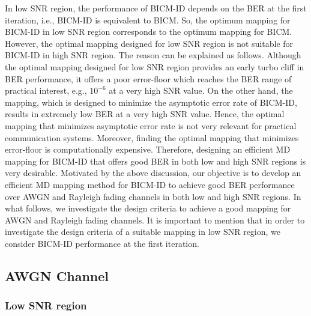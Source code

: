 \documentclass[12pt, draftclsnofoot, onecolumn]{IEEEtran}
\begin{document}
In low SNR region,   the performance of BICM-ID  depends on the    
BER  at the  first iteration, i.e.,  BICM-ID is equivalent to BICM.  So,  the optimum mapping for BICM-ID in low SNR region corresponds to  the optimum mapping for BICM. 
However, the optimal mapping designed for  low SNR region   is  not suitable for BICM-ID in  high SNR region. The reason can be explained as follows.  Although the optimal mapping designed for low SNR region provides an early turbo cliff in BER performance, it offers a poor error-floor which reaches the BER range of  practical interest, e.g., $10^{-6}$ at a very high SNR value.
 On the other hand,  the  mapping, which  is designed to minimize  the asymptotic error rate  of  BICM-ID, results in  extremely  low BER  at a very high SNR value.  Hence,  the  optimal mapping  that minimizes   asymptotic error rate   is not very relevant  for practical communication systems.  Moreover, finding the optimal mapping that minimizes error-floor is computationally expensive. Therefore, designing an efficient  MD mapping for BICM-ID that  offers   good BER in both  low and high SNR regions is very desirable. 
Motivated by the above discussion,  our objective  is to develop  an efficient MD mapping method  for BICM-ID to achieve   good BER performance   over AWGN and Rayleigh fading channels in  both low and high SNR regions. In what follows, we investigate     the  design criteria to achieve a good  mapping for AWGN and Rayleigh fading channels. It is important to  mention  that in order to investigate the design criteria of a suitable   mapping in low SNR region, we consider BICM-ID performance at the first iteration.  \color{black}

\subsection{AWGN Channel}

\subsubsection{Low SNR region}
\end{document}
